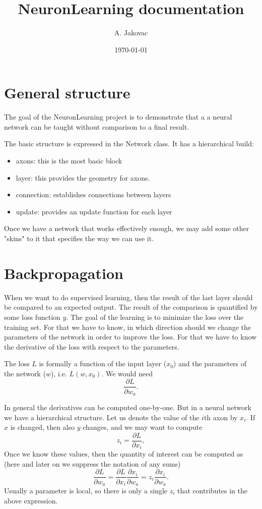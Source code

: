 \documentclass[10pt,a4paper]{article}
\author{A. Jakovac}
\title{NeuronLearning documentation}
\date{\today}
\begin{document}
\section{General structure}

The goal of the NeuronLearning project is to demonstrate that a a neural network can be taught without comparison to a final result.

The basic structure is expressed in the Network class. It has a hierarchical build:
\begin{itemize}
\item axons: this is the most basic block
\item layer: this provides the geometry for axons.
\item connection: establishes connections between layers
\item update: provides an update function for each layer
\end{itemize}

Once we have a network that works effectively enough, we may add some other "skins" to it that specifies the way we can use it.

\section{Backpropagation}

When we want to do supervised learning, then the result of the last layer should be compared to an expected output. The result of the comparison is quantified by some loss function $y$. The goal of the learning is to minimize the loss over the training set. For that we have to know, in which direction should we change the parameters of the network in order to improve the loss. For that we have to know the derivative of the loss with respect to the parameters. 

The loss $L$ is formally a function of the input layer ($x_0$) and the parameters of the network ($w$), i.e. $L(w, x_0)$. We would need
\begin{equation}
\frac{\partial L}{\partial w_a}.
\end{equation}

In general the derivatives can be computed one-by-one. But in a neural network we have a hierarchical structure. Let us denote the value of the $i$th axon by $x_i$. If $x$ is changed, then also $y$ changes, and we may want to compute
\begin{equation}
z_i = \frac{\partial L}{\partial x_i},
\end{equation}
Once we know these values, then the quantity of interest can be computed as (here and later on we suppress the notation of any sums) 
\begin{equation}
\frac{\partial L}{\partial w_a} = \frac{\partial L}{\partial x_i} \frac{\partial x_i}{\partial w_a} = z_i \frac{\partial x_i}{\partial w_a}.
\end{equation}
Usually a parameter is local, so there is only a single $z_i$ that contributes in the above expression.
\end{document}
